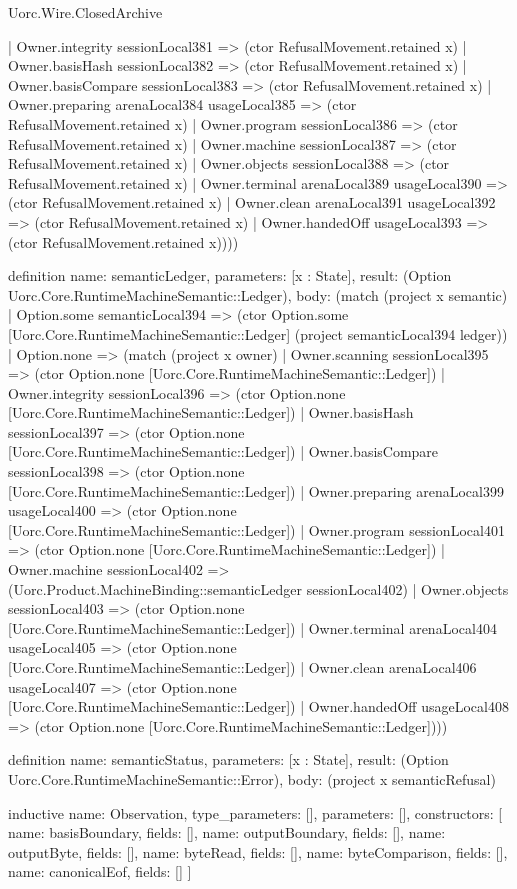 \begin{lexlean}{Uorc.Wire.ClosedArchive}
\begin{semanticmodule}
{    | Owner.integrity sessionLocal381 => (ctor RefusalMovement.retained x)
    | Owner.basisHash sessionLocal382 => (ctor RefusalMovement.retained x)
    | Owner.basisCompare sessionLocal383 => (ctor RefusalMovement.retained x)
    | Owner.preparing arenaLocal384 usageLocal385 => (ctor RefusalMovement.retained x)
    | Owner.program sessionLocal386 => (ctor RefusalMovement.retained x)
    | Owner.machine sessionLocal387 => (ctor RefusalMovement.retained x)
    | Owner.objects sessionLocal388 => (ctor RefusalMovement.retained x)
    | Owner.terminal arenaLocal389 usageLocal390 => (ctor RefusalMovement.retained x)
    | Owner.clean arenaLocal391 usageLocal392 => (ctor RefusalMovement.retained x)
    | Owner.handedOff usageLocal393 => (ctor RefusalMovement.retained x))))
}

definition{
  name: semanticLedger,
  parameters: [x : State],
  result: (Option Uorc.Core.RuntimeMachineSemantic::Ledger),
  body: (match (project x semantic)
    | Option.some semanticLocal394 => (ctor Option.some [Uorc.Core.RuntimeMachineSemantic::Ledger] (project semanticLocal394 ledger))
    | Option.none => (match (project x owner)
      | Owner.scanning sessionLocal395 => (ctor Option.none [Uorc.Core.RuntimeMachineSemantic::Ledger])
      | Owner.integrity sessionLocal396 => (ctor Option.none [Uorc.Core.RuntimeMachineSemantic::Ledger])
      | Owner.basisHash sessionLocal397 => (ctor Option.none [Uorc.Core.RuntimeMachineSemantic::Ledger])
      | Owner.basisCompare sessionLocal398 => (ctor Option.none [Uorc.Core.RuntimeMachineSemantic::Ledger])
      | Owner.preparing arenaLocal399 usageLocal400 => (ctor Option.none [Uorc.Core.RuntimeMachineSemantic::Ledger])
      | Owner.program sessionLocal401 => (ctor Option.none [Uorc.Core.RuntimeMachineSemantic::Ledger])
      | Owner.machine sessionLocal402 => (Uorc.Product.MachineBinding::semanticLedger sessionLocal402)
      | Owner.objects sessionLocal403 => (ctor Option.none [Uorc.Core.RuntimeMachineSemantic::Ledger])
      | Owner.terminal arenaLocal404 usageLocal405 => (ctor Option.none [Uorc.Core.RuntimeMachineSemantic::Ledger])
      | Owner.clean arenaLocal406 usageLocal407 => (ctor Option.none [Uorc.Core.RuntimeMachineSemantic::Ledger])
      | Owner.handedOff usageLocal408 => (ctor Option.none [Uorc.Core.RuntimeMachineSemantic::Ledger])))
}

definition{
  name: semanticStatus,
  parameters: [x : State],
  result: (Option Uorc.Core.RuntimeMachineSemantic::Error),
  body: (project x semanticRefusal)
}

inductive{
  name: Observation,
  type_parameters: [],
  parameters: [],
  constructors: [
    {name: basisBoundary, fields: []},
    {name: outputBoundary, fields: []},
    {name: outputByte, fields: []},
    {name: byteRead, fields: []},
    {name: byteComparison, fields: []},
    {name: canonicalEof, fields: []}
  ]
}


\end{semanticmodule}
\end{lexlean}
